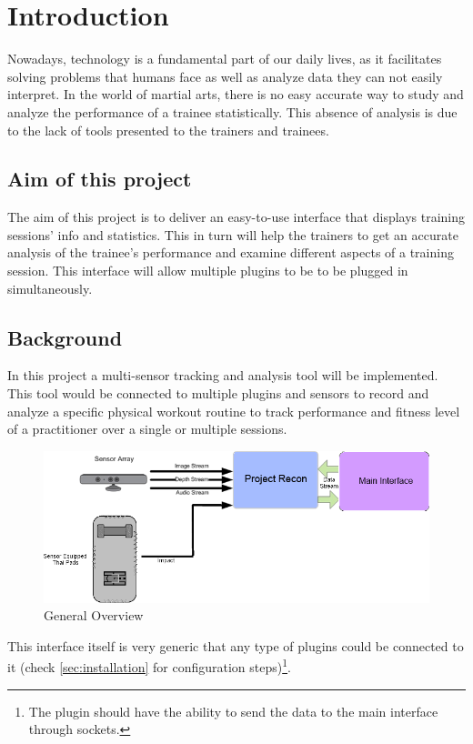\chapter{Introduction}
\label{chap:intro}

Nowadays, technology is a fundamental part of our daily lives, as it facilitates solving problems that humans face as well as analyze data they can not easily interpret.
In the world of martial arts, there is no easy accurate way to study and analyze the performance of a trainee statistically. This absence of analysis is due to the lack of tools presented to the trainers and trainees.

\section{Aim of this project}
The aim of this project is to deliver an easy-to-use interface that displays training sessions' info and statistics. This in turn will help the trainers to get an accurate analysis of the trainee's performance and examine different aspects of a training session. This interface will allow multiple plugins to be to be plugged in simultaneously.

\section{Background}
In this project a multi-sensor tracking and analysis tool will be implemented. This tool would be connected to multiple plugins and sensors to record and analyze a specific physical workout routine to track performance and fitness level of a practitioner over a single or multiple sessions.

\begin{figure}[htbp]
\centering 
\includegraphics[width=1.0\linewidth]{General.png} 
\caption{General Overview} 
\label{fig:overview} 
\end{figure} 

This interface itself is very generic that any type of plugins could be connected to it (check \ref{sec:installation} for configuration steps)\footnote{The plugin should have the ability to send the data to the main interface through sockets.}.
